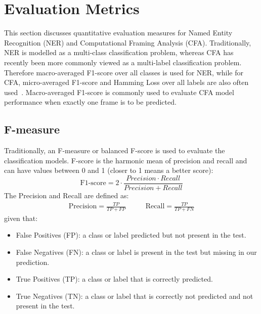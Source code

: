 \section{Evaluation Metrics}

This section discusses quantitative evaluation measures for Named Entity Recognition (NER) and Computational Framing Analysis (CFA).
Traditionally, NER is modelled as a multi-class classification problem, whereas CFA has recently been more commonly viewed as a multi-label classification problem.
Therefore macro-averaged F1-score over all classes is used for NER, while for CFA, micro-averaged F1-score and Hamming Loss over all labels are also often used~\parencite{yang2018sgm}.
Macro-averaged F1-score is commonly used to evaluate CFA model performance when exactly one frame is to be predicted.

\subsection{F-measure}

Traditionally, an F-measure or balanced F-score is used to evaluate the classification models.
F-score is the harmonic mean of precision and recall and can have values between 0 and 1 (closer to 1 means a better score):
\begin{equation*}
    \text{F1-score} = 2  \cdot \frac{Precision \cdot Recall}{Precision +  Recall}
\end{equation*}
The Precision and Recall are defined as:
\begin{equation*}
\begin{split}
    \text{Precision} = \frac{TP}{TP + FP}
\end{split}
\quad\quad
\begin{split}
    \text{Recall} = \frac{TP}{TP + FN}
\end{split}
\end{equation*}
given that:
\begin{itemize}
  \item False Positives (FP): a class or label predicted but not present in the test.
  \item False Negatives (FN): a class or label is present in the test but missing in our prediction.
  \item True Positives (TP): a class or label that is correctly predicted.
  \item True Negatives (TN): a class or label that is correctly not predicted and not present in the test.
\end{itemize}

